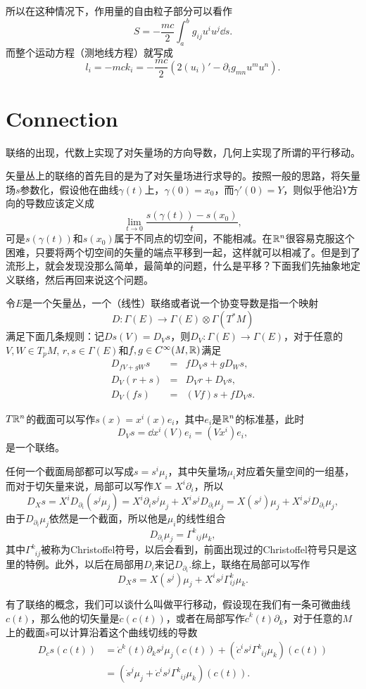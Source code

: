 所以在这种情况下，作用量的自由粒子部分可以看作
\[
	S=-\frac{mc}{2}\int_a^b g_{ij}u^i u^j \dd s.
\]
而整个运动方程（测地线方程）就写成
\[
	l_i=-mck_i=-\frac{mc}{2}\left(2(u_i)'-\partial_ig_{mn}u^mu^n\right).
\]

\section{Connection}

联络的出现，代数上实现了对矢量场的方向导数，几何上实现了所谓的平行移动。

\para 矢量丛上的联络的首先目的是为了对矢量场进行求导的。按照一般的思路，将矢量场$s$参数化，假设他在曲线$\gamma(t)$上，$\gamma(0)=x_0$，而$\gamma'(0)=Y$，则似乎他沿$Y$方向的导数应该定义成
\[
	\lim_{t\to 0}\frac{s(\gamma(t))-s(x_0)}{t},
\]
可是$s(\gamma(t))$和$s(x_0)$属于不同点的切空间，不能相减。在$\mathbb{R}^n$很容易克服这个困难，只要将两个切空间的矢量的端点平移到一起，这样就可以相减了。但是到了流形上，就会发现没那么简单，最简单的问题，什么是平移？下面我们先抽象地定义联络，然后再回来说这个问题。

\para 令$E$是一个矢量丛，一个（线性）联络或者说一个协变导数是指一个映射
\[
	D:\Gamma (E)\to\Gamma(E)\otimes \Gamma(T^*M)
\]
满足下面几条规则：记$Ds(V)=D_Vs$，则$D_V:\Gamma (E)\to\Gamma(E)$，对于任意的$V,W\in T_p M$, $r,s\in \Gamma (E)$和$f,g\in C^\infty(M,\mathbb{R})$满足
\[
\begin{array}{lcl} 
	D_{fV+gW}s &=& fD_Vs+gD_W s,\\
	D_V(r+s)   &=& D_Vr+D_Vs,\\
	D_V(fs)    &=& (Vf)s+fD_Vs.
\end{array}
\]

$T\mathbb{R}^n$的截面可以写作$s(x)=x^i(x)e_i$，其中$e_i$是$\mathbb{R}^n$的标准基，此时
\[
	D_Vs=\dd x^i(V) e_i=(Vx^i)e_i,
\]
是一个联络。

任何一个截面局部都可以写成$s=s^i\mu_i$，其中矢量场$\mu_i$对应着矢量空间的一组基，而对于切矢量来说，局部可以写作$X=X^i\partial_i$，所以
\[
	D_Xs=X^iD_{\partial_i}(s^j\mu_j)=X^i\partial_i s^j\mu_j+X^is^jD_{\partial_i}\mu_j=X(s^j)\mu_j+X^is^jD_{\partial_i}\mu_j,
\]
由于$D_{\partial_i}\mu_j$依然是一个截面，所以他是$\mu_i$的线性组合
\[
	D_{\partial_i}\mu_j=\Gamma^k_{\phantom{k}ij}\mu_k,
\]
其中$\Gamma^k_{\phantom{k}ij}$被称为Christoffel符号，以后会看到，前面出现过的Christoffel符号只是这里的特例。此外，以后在局部用$D_i$来记$D_{\partial_i}$.综上，联络在局部可以写作
\[
	D_Xs=X(s^j)\mu_j+X^is^j\Gamma^{k}_{ij}\mu_k.
\]

有了联络的概念，我们可以谈什么叫做平行移动，假设现在我们有一条可微曲线$c(t)$，那么他的切矢量是$\dot{c}(c(t))$，或者在局部写作$\dot{c}^k(t)\partial_k$，对于任意的$M$上的截面$s$可以计算沿着这个曲线切线的导数
\begin{align*}
	D_{\dot{c}}s(c(t))&=\dot{c}^k(t)\partial_ks^j\mu_j(c(t))+(\dot{c}^i s^j\Gamma^k_{\phantom{k}ij}\mu_k)(c(t))\\
	&=\left(\dot{s}^j\mu_j+\dot{c}^i s^j\Gamma^k_{\phantom{k}ij}\mu_k\right)(c(t)).
\end{align*}

